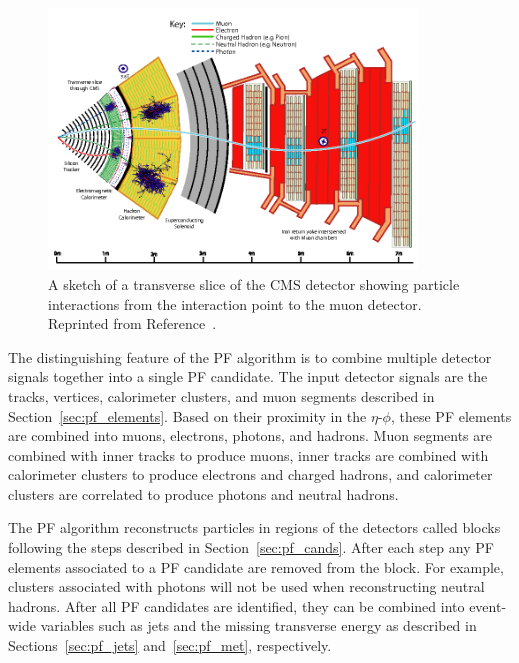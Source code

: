 \begin{figure}[htbp]
  \begin{center}
    \includegraphics[width=0.875\textwidth]{Reconstruction/Figures/cms_slice.png}
    \caption{
      A sketch of a transverse slice of the CMS detector showing particle interactions from the interaction point to the muon detector.
      Reprinted from Reference~\cite{}. %
    }
    \label{fig:cms_slice}
  \end{center}
\end{figure}

The distinguishing feature of the PF algorithm is to combine multiple detector signals together into a single PF candidate.
The input detector signals are the tracks, vertices, calorimeter clusters, and muon segments described in Section~\ref{sec:pf_elements}.
Based on their proximity in the $\eta$-$\phi$, these PF elements are combined into muons, electrons, photons, and hadrons.
Muon segments are combined with inner tracks to produce muons, inner tracks are combined with calorimeter clusters to produce electrons and charged hadrons, and calorimeter clusters are correlated to produce photons and neutral hadrons.

The PF algorithm reconstructs particles in regions of the detectors called blocks following the steps described in Section~\ref{sec:pf_cands}.
After each step any PF elements associated to a PF candidate are removed from the block.
For example, clusters associated with photons will not be used when reconstructing neutral hadrons.
After all PF candidates are identified, they can be combined into event-wide variables such as jets and the missing transverse energy as described in Sections~\ref{sec:pf_jets} and~\ref{sec:pf_met}, respectively. 

